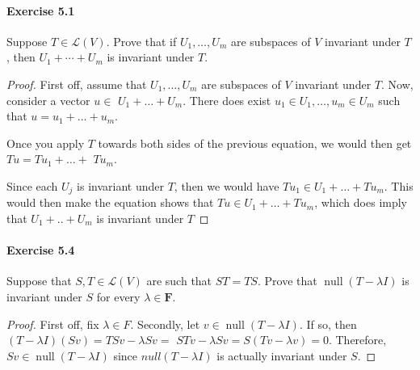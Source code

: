 \documentclass{article}
\theoremstyle{definition}
\begin{document}
\paragraph{Exercise 5.1} Suppose $T \in \mathcal{L}(V)$. Prove that if $U_{1}, \ldots, U_{m}$ are subspaces of $V$ invariant under $T$, then $U_{1}+\cdots+U_{m}$ is invariant under $T$.
\begin{proof}
    First off, assume that $U_1, \ldots, U_m$ are subspaces of $V$ invariant under $T$. Now, consider a vector $u \in$ $U_1+\ldots+U_m$. There does exist $u_1 \in U_1, \ldots, u_m \in U_m$ such that $u=u_1+\ldots+u_m$.

Once you apply $T$ towards both sides of the previous equation, we would then get $T u=T u_1+\ldots+$ $T u_m$.

Since each $U_j$ is invariant under $T$, then we would have $T u_1 \in U_1+\ldots+T u_m$. This would then make the equation shows that $T u \in U_1+\ldots+T u_m$, which does imply that $U_1+. .+U_m$ is invariant under $T$
\end{proof}



\paragraph{Exercise 5.4} Suppose that $S, T \in \mathcal{L}(V)$ are such that $S T=T S$. Prove that $\operatorname{null} (T-\lambda I)$ is invariant under $S$ for every $\lambda \in \mathbf{F}$.
\begin{proof}
    First off, fix $\lambda \in F$. Secondly, let $v \in \operatorname{null}(T-\lambda I)$. If so, then $(T-\lambda I)(S v)=T S v-\lambda S v=$ $S T v-\lambda S v=S(T v-\lambda v)=0$. Therefore, $S v \in \operatorname{null}(T-\lambda I)$ since $n u l l(T-\lambda I)$ is actually invariant under $S$.
\end{proof}
\end{document}
